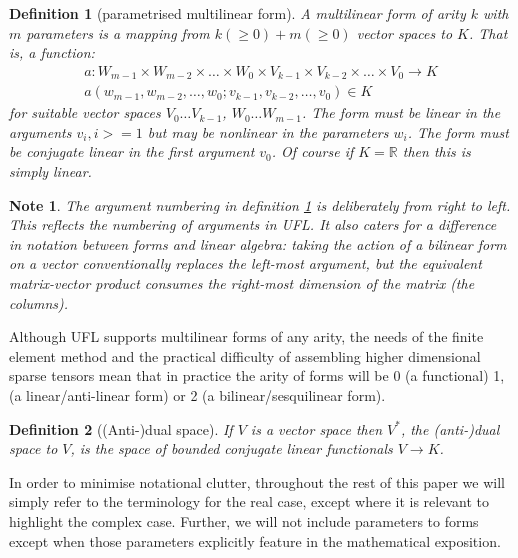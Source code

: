 \documentclass[a4paper,11pt]{article}
\newtheorem{definition}{Definition}[section]
\newtheorem{note}{Note}[section]
\begin{document}
\begin{definition}[parametrised multilinear form]\label{kform}
    A \emph{multilinear form} of \emph{arity} $k$  with $m$ \emph{parameters} is a mapping from $k(\ge0) + m(\ge0)$ vector spaces to $K$. That is, a function:
    \begin{gather} 
    a:W_{m-1} \times W_{m-2} \times \ldots \times W_{0} \times V_{k-1} \times V_{k-2} \times \ldots \times V_{0} \rightarrow K\\
    a(w_{m-1}, w_{m-2}, \ldots, w_0; v_{k-1}, v_{k-2}, \ldots, v_0) \in K
    \end{gather} 
    for suitable vector spaces $V_0\ldots V_{k-1}$, $W_0\ldots W_{m-1}$. The form must be linear in the arguments $v_i, i>=1$ but may be nonlinear in the parameters $w_i$. The form must be conjugate linear in the first argument $v_0$. Of course if $K=\mathbb{R}$ then this is simply linear.
\end{definition}

\begin{note}
    The argument numbering in definition \ref{kform} is deliberately from right to left. This reflects the numbering of arguments in UFL. It also caters for a difference in notation between forms and linear algebra: taking the action of a bilinear form on a vector conventionally replaces the left-most argument, but the equivalent matrix-vector product consumes the right-most dimension of the matrix (the columns).
\end{note}

Although UFL supports multilinear forms of any arity, the needs of the finite element method and the practical difficulty of assembling higher dimensional sparse tensors mean that in practice the arity of forms will be 0 (a functional) 1, (a linear/anti-linear form) or 2 (a bilinear/sesquilinear form). 

\begin{definition}[(Anti-)dual space]\label{dualspace}
    If $V$ is a vector space then $V^*$, the (anti-)dual space to $V$, is the space of bounded conjugate linear functionals $V\rightarrow K$.
\end{definition}

In order to minimise notational clutter, throughout the rest of this paper we will simply refer to the terminology for the real case, except where it is relevant to highlight the complex case. Further, we will not include parameters to forms except when those parameters explicitly feature in the mathematical exposition.
\end{document}
